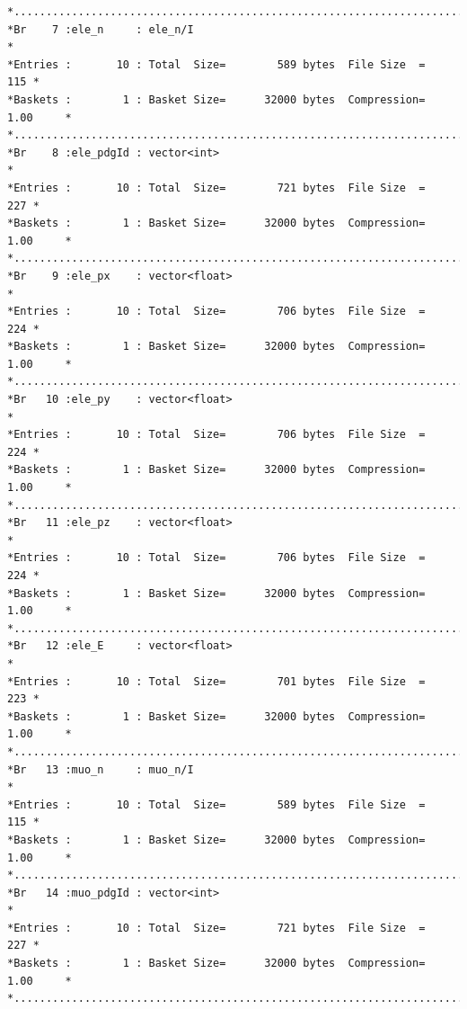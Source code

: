 {\begin{verbatim}
*............................................................................*
*Br    7 :ele_n     : ele_n/I                                                *
*Entries :       10 : Total  Size=        589 bytes  File Size  =        115 *
*Baskets :        1 : Basket Size=      32000 bytes  Compression=   1.00     *
*............................................................................*
*Br    8 :ele_pdgId : vector<int>                                            *
*Entries :       10 : Total  Size=        721 bytes  File Size  =        227 *
*Baskets :        1 : Basket Size=      32000 bytes  Compression=   1.00     *
*............................................................................*
*Br    9 :ele_px    : vector<float>                                          *
*Entries :       10 : Total  Size=        706 bytes  File Size  =        224 *
*Baskets :        1 : Basket Size=      32000 bytes  Compression=   1.00     *
*............................................................................*
*Br   10 :ele_py    : vector<float>                                          *
*Entries :       10 : Total  Size=        706 bytes  File Size  =        224 *
*Baskets :        1 : Basket Size=      32000 bytes  Compression=   1.00     *
*............................................................................*
*Br   11 :ele_pz    : vector<float>                                          *
*Entries :       10 : Total  Size=        706 bytes  File Size  =        224 *
*Baskets :        1 : Basket Size=      32000 bytes  Compression=   1.00     *
*............................................................................*
*Br   12 :ele_E     : vector<float>                                          *
*Entries :       10 : Total  Size=        701 bytes  File Size  =        223 *
*Baskets :        1 : Basket Size=      32000 bytes  Compression=   1.00     *
*............................................................................*
*Br   13 :muo_n     : muo_n/I                                                *
*Entries :       10 : Total  Size=        589 bytes  File Size  =        115 *
*Baskets :        1 : Basket Size=      32000 bytes  Compression=   1.00     *
*............................................................................*
*Br   14 :muo_pdgId : vector<int>                                            *
*Entries :       10 : Total  Size=        721 bytes  File Size  =        227 *
*Baskets :        1 : Basket Size=      32000 bytes  Compression=   1.00     *
*............................................................................*

\end{verbatim}}
